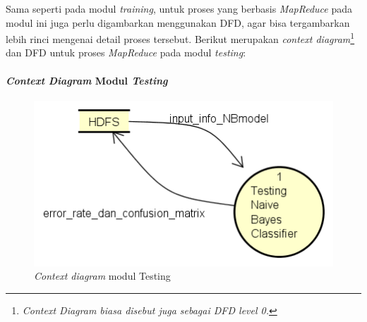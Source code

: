Sama seperti pada modul \textit{training}, untuk proses yang berbasis \textit{MapReduce} pada modul ini juga perlu digambarkan menggunakan DFD, agar bisa tergambarkan lebih rinci mengenai detail proses tersebut. Berikut merupakan \textit{context diagram}\footnote{\textit{Context Diagram biasa disebut juga sebagai DFD level 0.}} dan DFD untuk proses \textit{MapReduce} pada modul \textit{testing}:

\paragraph{\textit{Context Diagram} Modul \textit{Testing}}
\label{par:contextdiagramTesting}
\begin{figure}[H]
	\centering
	\includegraphics[scale=0.65]{Diagram/DFD_0_Testing}
	\caption[\textit{Context diagram} modul Testing]{\textit{Context diagram} modul Testing}
	\label{fig:Context diagram modul Testing}
\end{figure}

